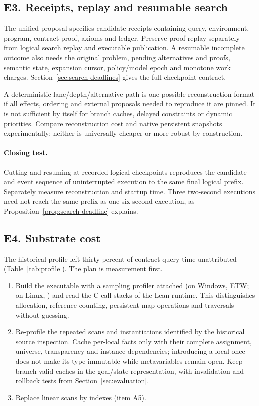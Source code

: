 \subsection{E3. Receipts, replay and resumable search}

The unified proposal specifies candidate receipts containing query, environment,
program, contract proof, axioms and ledger. Preserve proof replay separately
from logical search replay and executable publication. A resumable incomplete
outcome also needs the original problem, pending alternatives and proofs,
semantic state, expansion cursor, policy/model epoch and monotone work charges.
Section~\ref{sec:search-deadlines} gives the full checkpoint contract.

A deterministic lane/depth/alternative path is one possible reconstruction
format if all effects, ordering and external proposals needed to reproduce it
are pinned. It is not sufficient by itself for branch caches, delayed
constraints or dynamic priorities. Compare reconstruction cost and native
persistent snapshots experimentally; neither is universally cheaper or more
robust by construction.

\paragraph{Closing test.} Cutting and resuming at recorded logical checkpoints
reproduces the candidate and event sequence of uninterrupted execution to the
same final logical prefix. Separately measure reconstruction and startup time.
Three two-second executions need not reach the same prefix as one six-second
execution, as Proposition~\ref{prop:search-deadline} explains.

\subsection{E4. Substrate cost}

The historical profile left thirty percent of contract-query time unattributed
(Table~\ref{tab:profile}). The plan is measurement first.
\begin{enumerate}
\item Build the executable with a sampling profiler attached (on Windows, ETW; on Linux, ) and read the C call stacks of the Lean runtime. This distinguishes allocation, reference counting, persistent-map operations and  traversals without guessing.
\item Re-profile the repeated scans and instantiations identified by the
historical source inspection. Cache per-local facts only with their complete
assignment, universe, transparency and instance dependencies; introducing a
local once does not make its type immutable while metavariables remain open.
Keep branch-valid caches in the goal/state representation, with invalidation
and rollback tests from Section~\ref{sec:evaluation}.
\item Replace linear scans by indexes (item A5).
\end{enumerate}
